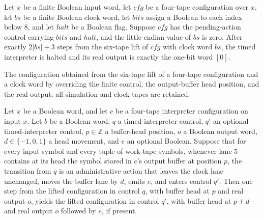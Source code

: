 \begin{lemma}
\label{Turing.timed_clock_timeout}
\leanok
{}
Let $x$ be a finite Boolean input word, let $cfg$ be a four-tape configuration over $x$,
let $bs$ be a finite Boolean clock word, let $bits$ assign a Boolean to each index below
$8$, and let $halt$ be a Boolean flag. Suppose $cfg$ has the pending-action control
carrying $bits$ and $halt$, and the little-endian value of $bs$ is zero. After exactly
$2|bs|+3$ steps from the six-tape lift of $cfg$ with clock word $bs$, the timed
interpreter is halted and its real output is exactly the one-bit word $[0]$.
\end{lemma}

\begin{definition}
\label{Turing.timedOutputCfg}
\leanok
{}
The configuration obtained from the six-tape lift of a four-tape configuration
and a clock word by overriding the finite control, the output-buffer head
position, and the real output; all simulation and clock tapes are retained.
\end{definition}

\begin{lemma}
\label{Turing.timed_output_step}
\leanok
{}
Let $x$ be a Boolean word, and let $c$ be a four-tape interpreter configuration on input
$x$. Let $b$ be a Boolean word, $q$ a timed-interpreter control, $q'$ an optional
timed-interpreter control, $p\in\mathbb{Z}$ a buffer-head position, $o$ a Boolean output
word, $d\in\{-1,0,1\}$ a head movement, and $e$ an optional Boolean. Suppose that for
every input symbol and every tuple of work-tape symbols, whenever lane $5$ contains at
its head the symbol stored in $c$'s output buffer at position $p$, the transition from
$q$ is an administrative action that leaves the clock lane unchanged, moves the buffer
lane by $d$, emits $e$, and enters control $q'$. Then one step from the lifted
configuration in control $q$, with buffer head at $p$ and real output $o$, yields the
lifted configuration in control $q'$, with buffer head at $p+d$ and real output $o$
followed by $e$, if present.
\end{lemma}

